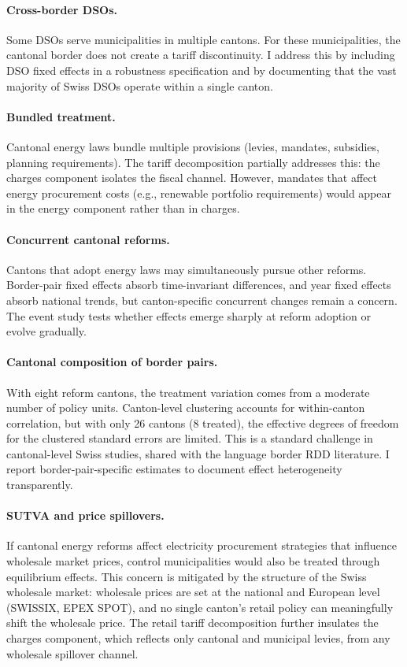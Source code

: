 \documentclass[12pt]{article}
\begin{document}
\paragraph{Cross-border DSOs.} Some DSOs serve municipalities in multiple cantons. For these municipalities, the cantonal border does not create a tariff discontinuity. I address this by including DSO fixed effects in a robustness specification and by documenting that the vast majority of Swiss DSOs operate within a single canton.

\paragraph{Bundled treatment.} Cantonal energy laws bundle multiple provisions (levies, mandates, subsidies, planning requirements). The tariff decomposition partially addresses this: the charges component isolates the fiscal channel. However, mandates that affect energy procurement costs (e.g., renewable portfolio requirements) would appear in the energy component rather than in charges.

\paragraph{Concurrent cantonal reforms.} Cantons that adopt energy laws may simultaneously pursue other reforms. Border-pair fixed effects absorb time-invariant differences, and year fixed effects absorb national trends, but canton-specific concurrent changes remain a concern. The event study tests whether effects emerge sharply at reform adoption or evolve gradually.

\paragraph{Cantonal composition of border pairs.} With eight reform cantons, the treatment variation comes from a moderate number of policy units. Canton-level clustering accounts for within-canton correlation, but with only 26 cantons (8 treated), the effective degrees of freedom for the clustered standard errors are limited. This is a standard challenge in cantonal-level Swiss studies, shared with the language border RDD literature. I report border-pair-specific estimates to document effect heterogeneity transparently.

\paragraph{SUTVA and price spillovers.} If cantonal energy reforms affect electricity procurement strategies that influence wholesale market prices, control municipalities would also be treated through equilibrium effects. This concern is mitigated by the structure of the Swiss wholesale market: wholesale prices are set at the national and European level (SWISSIX, EPEX SPOT), and no single canton's retail policy can meaningfully shift the wholesale price. The retail tariff decomposition further insulates the charges component, which reflects only cantonal and municipal levies, from any wholesale spillover channel.
\end{document}
